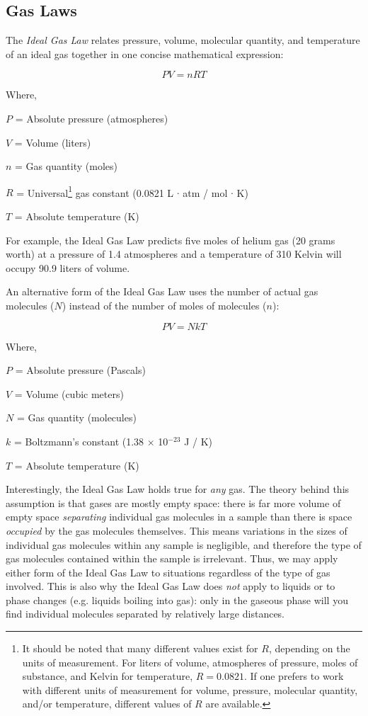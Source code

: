 \filbreak
\subsection{Gas Laws}

The \textit{Ideal Gas Law} relates pressure, volume, molecular quantity, and temperature of an ideal gas together in one concise mathematical expression:  

$$PV = nRT$$

\noindent
Where,

$P$ = Absolute pressure (atmospheres)

$V$ = Volume (liters)

$n$ = Gas quantity (moles)

$R$ = Universal\footnote{It should be noted that many different values exist for $R$, depending on the units of measurement.  For liters of volume, atmospheres of pressure, moles of substance, and Kelvin for temperature, $R = 0.0821$.  If one prefers to work with different units of measurement for volume, pressure, molecular quantity, and/or temperature, different values of $R$ are available.} gas constant (0.0821 L $\cdot$ atm / mol $\cdot$ K)

$T$ = Absolute temperature (K)

\vskip 10pt

For example, the Ideal Gas Law predicts five moles of helium gas (20 grams worth) at a pressure of 1.4 atmospheres and a temperature of 310 Kelvin will occupy 90.9 liters of volume.

\vskip 10pt

An alternative form of the Ideal Gas Law uses the number of actual gas molecules ($N$) instead of the number of moles of molecules ($n$):

$$PV = NkT$$

\noindent
Where,

$P$ = Absolute pressure (Pascals)

$V$ = Volume (cubic meters)

$N$ = Gas quantity (molecules)

$k$ = Boltzmann's constant (1.38 $\times$ 10$^{-23}$ J / K)

$T$ = Absolute temperature (K)

\vskip 10pt

Interestingly, the Ideal Gas Law holds true for \textit{any} gas.  The theory behind this assumption is that gases are mostly empty space: there is far more volume of empty space \textit{separating} individual gas molecules in a sample than there is space \textit{occupied} by the gas molecules themselves.  This means variations in the sizes of individual gas molecules within any sample is negligible, and therefore the type of gas molecules contained within the sample is irrelevant.  Thus, we may apply either form of the Ideal Gas Law to situations regardless of the type of gas involved.  This is also why the Ideal Gas Law does \textit{not} apply to liquids or to phase changes (e.g. liquids boiling into gas): only in the gaseous phase will you find individual molecules separated by relatively large distances.

